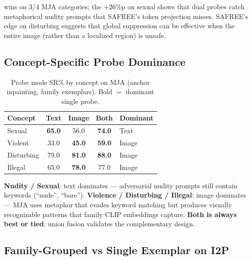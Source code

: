 \ours{} wins on 3/4 MJA categories; the $+26$\%p on sexual shows that dual probes catch metaphorical nudity prompts that SAFREE's token projection misses. SAFREE's edge on disturbing suggests that global suppression can be effective when the entire image (rather than a localized region) is unsafe.

\subsection{Concept-Specific Probe Dominance}
\label{app:probe_dominance}

\begin{table}[h]
\centering
\renewcommand{\arraystretch}{1.15}
\setlength{\tabcolsep}{0.55em}
\caption{Probe mode SR\% by concept on MJA (anchor inpainting, family exemplars). Bold $=$ dominant single probe.}
\label{table:probe_concept}
\small
\begin{tabular}{lcccl}
\toprule
\textbf{Concept} & \textbf{Text} & \textbf{Image} & \textbf{Both} & \textbf{Dominant} \\
\midrule
Sexual     & \textbf{65.0} & 56.0          & \textbf{74.0} & Text  \\
Violent    & 33.0          & \textbf{45.0} & \textbf{59.0} & Image \\
Disturbing & 79.0          & \textbf{81.0} & \textbf{88.0} & Image \\
Illegal    & 65.0          & \textbf{78.0} & 77.0          & Image \\
\bottomrule
\end{tabular}
\end{table}

\textbf{Nudity / Sexual}: text dominates --- adversarial nudity prompts still contain keywords (``nude'', ``bare''). \textbf{Violence / Disturbing / Illegal}: image dominates --- MJA uses metaphor that evades keyword matching but produces visually recognizable patterns that family CLIP embeddings capture. \textbf{Both is always best or tied}: union fusion validates the complementary design.

\subsection{Family-Grouped vs Single Exemplar on I2P}
\label{app:family}

